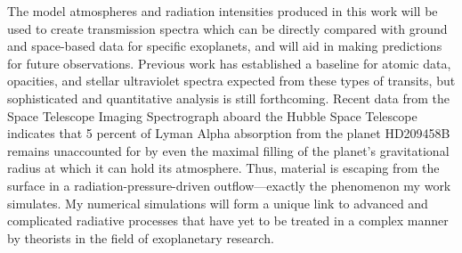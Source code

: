 The model atmospheres and radiation intensities produced in this work will be used to create transmission spectra which can be directly compared with ground and space-based data for specific exoplanets, and will aid in making predictions for future observations. Previous work has established a baseline for atomic data, opacities, and stellar ultraviolet spectra expected from these types of transits, but sophisticated and quantitative analysis is still forthcoming. Recent data from the Space Telescope Imaging Spectrograph aboard the Hubble Space Telescope indicates that 5 percent of Lyman Alpha absorption from the planet HD209458B remains unaccounted for by even the maximal filling of the planet's gravitational radius at which it can hold its atmosphere. Thus, material is escaping from the surface in a radiation-pressure-driven outflow---exactly the phenomenon my work simulates. My numerical simulations will form a unique link to advanced and complicated radiative processes that have yet to be treated in a complex manner by theorists in the field of exoplanetary research. 